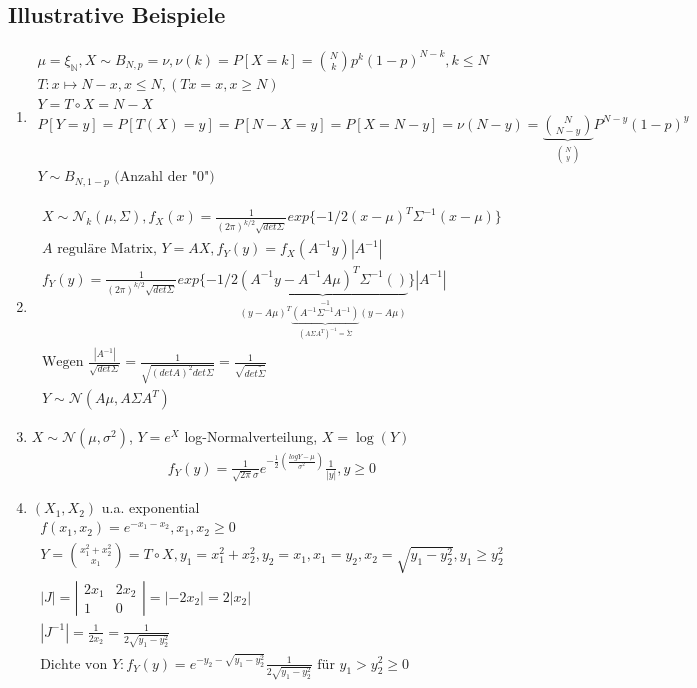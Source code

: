 \documentclass[]{article}
\begin{document}
\subsection{Illustrative Beispiele}
\begin{enumerate}
	\item \begin{align*}
		\mu = \xi_\mathbb{N}, X \sim B_{N,p} = \nu, \nu(k) = P[X=k] = \binom{N}{k} p^k (1-p)^{N-k}, k\leq N\\
		T : x \mapsto N-x, x \leq N, (Tx=x, x\geq N)\\
		Y=T\circ X = N-X\\
		P[Y=y] = P[T(X)=y] = P[N-X=y] = P[X=N-y] = \nu(N-y) = \underbrace{\binom{N}{N-y}}_{\binom{N}{y}} P^{N-y} (1-p)^y\\
		Y \sim B_{N,1-p} \text{ (Anzahl der "0")}
	\end{align*}

	\item \begin{align*}
		X \sim \mathcal{N}_k(\mu, \Sigma), f_X(x) = \frac{1}{(2\pi)^{k/2} \sqrt{det \Sigma}} exp\{-1/2 (x-\mu)^T \Sigma ^{-1}(x-\mu)\}\\
		A \text{ reguläre Matrix, } Y=AX, f_Y(y) = f_X(A^{-1}y) |A^{-1}|\\
		f_Y(y) = \frac{1}{(2\pi)^{k/2} \sqrt{det \Sigma}} exp\{-1/2 \underbrace{(A^{-1}y - A^{-1}A\mu)^T \Sigma^{-1}( )}_{(y-A\mu)^T \underbrace{(A^{-1}\Sigma^{-1}A^{-1})}_{(A\Sigma A^T)^{-1} = \tilde{\Sigma}}^{-1}(y-A\mu)} \}|A^{-1}|\\
		\text{Wegen } \frac{|A^{-1}|}{\sqrt{det \Sigma}} = \frac{1}{\sqrt{(det A)^2 det\Sigma}} = \frac{1}{\sqrt{det \tilde{\Sigma}}}\\
		Y \sim \mathcal{N}(A\mu, A\Sigma A^T)
	\end{align*}

	\item $X\sim \mathcal{N}(\mu, \sigma^2)$, $Y=e^X$ log-Normalverteilung, $X=\log(Y)$
	\begin{align*}
		f_Y(y) = \frac{1}{\sqrt{2\pi} \sigma} e^{-\frac{1}{2} \left( \frac{log Y - \mu}{\sigma^2} \right)} \frac{1}{|y|}, y \geq 0
	\end{align*}

	\item $(X_1,X_2)$ u.a. exponential
	\begin{align*}
		f(x_1,x_2) = e^{-x_1-x_2}, x_1,x_2 \geq 0\\
		Y = \binom{x_1^2+x_2^2}{x_1} = T \circ X, y_1 = x_1^2 + x_2^2, y_2 = x_1, x_1 = y_2, x_2 = \sqrt{y_1 - y_2^2}, y_1 \geq y_2^2\\
		|J| = \left| \begin{matrix}
			2x_1 & 2x_2\\
			1 & 0
		\end{matrix} \right| = |-2x_2| = 2|x_2|\\
		|J^{-1}| = \frac{1}{2x_2} = \frac{1}{2\sqrt{y_1 - y_2^2}}\\
		\text{Dichte von }Y: f_Y(y) = e^{-y_2 -\sqrt{y_1-y_2^2}}\frac{1}{2\sqrt{y_1-y_2^2}} \text{ für } y_1 > y_2^2 \geq 0
	\end{align*}


\end{enumerate}
\end{document}
